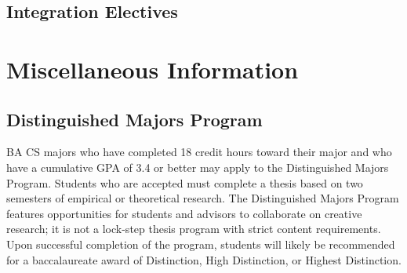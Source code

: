 \documentclass[10pt,letter,twocolumn]{book}
\newenvironment{numlist}{
\begin{enumerate}
\setlength{\itemsep}{0pt}
\setlength{\parskip}{0pt}}
{\end{enumerate}}
\newcommand{\mysection}[1]{\section{#1}\renewcommand{\rightmark}{#1}}
\begin{document}
\subsection{Integration Electives}
\label{sec:bacs-integrationelectives}




\mysection{Miscellaneous Information}


%
%
%
%
%
%


\subsection{Distinguished Majors Program}
\label{sec:badmp}

BA CS majors who have completed 18 credit hours toward their major
and who have a cumulative GPA of 3.4 or better may apply to the
Distinguished Majors Program. Students who are accepted must complete
a thesis based on two semesters of empirical or theoretical
research. The Distinguished Majors Program features opportunities for
students and advisors to collaborate on creative research; it is not a
lock-step thesis program with strict content requirements. Upon
successful completion of the program, students will likely be
recommended for a baccalaureate award of Distinction, High
Distinction, or Highest Distinction.
\end{document}
